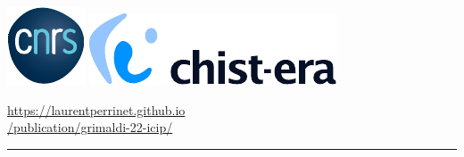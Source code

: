 \documentclass[landscape,a0]{a0poster}
\begin{document}
%
\begin{minipage}[t]{0.175\textwidth}
%
\vspace{-9cm}
\includegraphics[height=.2\textwidth]{figures/cnrs_logo.pdf}\hspace{1cm} \includegraphics[height=.2\textwidth]{figures/chistera_logo.pdf}\hspace{1cm}
\vspace{.25cm}

\begin{center}
\color{blue}
\Large
\href{https://laurentperrinet.github.io/publication/grimaldi-22-icip/}{https://laurentperrinet.github.io
\\ /publication/grimaldi-22-icip/} \end{center}
\vspace{2cm}

\end{minipage}
%
\vspace*{-1.5cm}
\hrule
\vspace{5pt}
\end{document}

